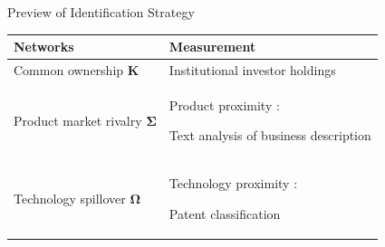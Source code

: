 \documentclass[
  10pt,               %
  aspectratio=169,    %
]{beamer}
\theoremstyle{plain}
\begin{document}
\begin{frame}{Preview of Identification Strategy}
  \label{identification_overview} %
  \begin{center}
        \renewcommand{\arraystretch}{1.5} %
        \begin{tabular}{lV{\linewidth}}
          Networks                              & Measurement\tabularnewline
          \hline\hline
          Common ownership $\bm{K}$         & Institutional investor holdings \citep{Backus2021-yt} \tabularnewline
          \hline
          Product market rivalry $\bm{\Sigma}$ & Product proximity \citep{Hoberg2016-jm}:

          Text analysis of business description \tabularnewline
          \hline
          Technology spillover $\bm{\Omega}$   & Technology proximity \citep{Jaffe1986-yz,Bloom2013-pn}:

          Patent classification\tabularnewline
        \end{tabular}
        \renewcommand{\arraystretch}{1.0} %
        \par\end{center}
\end{frame}
\end{document}
